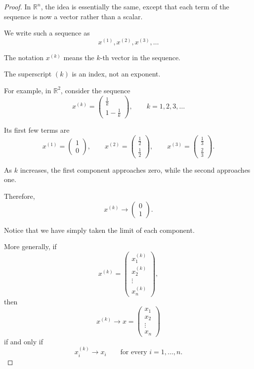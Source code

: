 \documentclass[11pt,a4paper]{article}
\theoremstyle{definition}
\theoremstyle{remark}
\begin{document}
\begin{proof}
In $\mathbb{R}^n$, the idea is
essentially the same, except that
each term of the sequence is now
a vector rather than a scalar.

We write such a sequence as
\[
x^{(1)},x^{(2)},x^{(3)},\ldots
\]

The notation $x^{(k)}$ means
the $k$-th vector in the sequence.

The superscript $(k)$ is an index,
not an exponent.

For example, in $\mathbb{R}^2$,
consider the sequence
\[
x^{(k)}
=
\begin{pmatrix}
\frac{1}{k}\\[2mm]
1-\frac{1}{k}
\end{pmatrix},
\qquad k=1,2,3,\ldots
\]

Its first few terms are
\[
x^{(1)}
=
\begin{pmatrix}
1\\0
\end{pmatrix},
\qquad
x^{(2)}
=
\begin{pmatrix}
\frac12\\[1mm]\frac12
\end{pmatrix},
\qquad
x^{(3)}
=
\begin{pmatrix}
\frac13\\[1mm]\frac23
\end{pmatrix}.
\]

As $k$ increases, the first
component approaches zero,
while the second approaches one.

Therefore,
\[
x^{(k)}
\longrightarrow
\begin{pmatrix}
0\\1
\end{pmatrix}.
\]

Notice that we have simply
taken the limit of each component.

More generally, if
\[
x^{(k)}
=
\begin{pmatrix}
x_1^{(k)}\\
x_2^{(k)}\\
\vdots\\
x_n^{(k)}
\end{pmatrix},
\]
then
\[
x^{(k)}
\longrightarrow
x=
\begin{pmatrix}
x_1\\
x_2\\
\vdots\\
x_n
\end{pmatrix}
\]
if and only if
\[
x_i^{(k)}\longrightarrow x_i
\qquad
\text{for every }i=1,\ldots,n.
\]


\end{proof}
\end{document}
